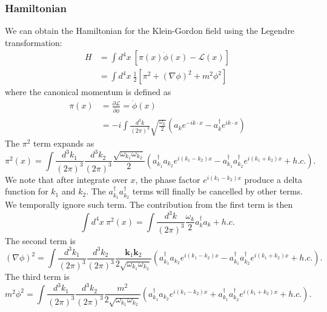 \subsubsection{Hamiltonian}

We can obtain the Hamiltonian for the Klein-Gordon field using the Legendre transformation:
\begin{equation}
\begin{aligned}
	H &= \int d^4 x\ \left[\pi(x) \dot{\phi}(x) - \mathcal L(x) \right] \\
	&= \int d^4 x\ \frac{1}{2} \left[\pi^2 + (\nabla \phi)^2 + m^2 \phi^2 \right]
\end{aligned}
\end{equation}
where the canonical momentum is defined as
\begin{equation}
\begin{aligned}
	\pi(x) &= \frac{\partial \mathcal L}{\partial \dot{\phi}} = \dot{\phi}(x) \\
	&= -i\int \frac{d^{3} k}{(2\pi)^{3}} \sqrt{\frac{\omega_{k}}{2}}\left(a_k 
		e^{-i k \cdot x} - a_k^{\dagger} e^{i k \cdot x}\right)
\end{aligned}
\end{equation}
The $\pi^2$ term expands as
\begin{equation}
	\pi^2(x) = \int \frac{d^{3} k_1}{(2\pi)^{3}} \frac{d^{3} k_2}{(2\pi)^{3}}
		\frac{\sqrt{\omega_{k_1} \omega_{k_2}}}{2} \left(a^\dagger_{k_1}a_{k_2}e^{i(k_1-k_2)x} - a^\dagger_{k_1} a^\dagger_{k_2} e^{i(k_1+k_2)x} + h.c.\right).
\end{equation}
We note that after integrate over $x$, the phase factor $e^{i(k_1-k_2)x}$ produce a delta function for $k_1$ and $k_2$.
The $a^\dagger_{k_1} a^\dagger_{k_2}$ terms will finally be cancelled by other terms.
We temporally ignore such term.
The contribution from the first term is then
\begin{equation}
	\int d^4 x\ \pi^2(x) = \int \frac{d^3 k}{(2\pi)^3} \frac{\omega_k}{2} a_k^\dagger a_k + h.c.
\end{equation}
The second term is
\begin{equation}
	(\nabla \phi)^2 = \int \frac{d^{3} k_1}{(2\pi)^{3}} \frac{d^{3} k_2}{(2\pi)^{3}}
		\frac{\bm k_1 \bm k_2}{2\sqrt{\omega_{k_1}\omega_{k_2}}} \left(a^\dagger_{k_1}a_{k_2}e^{i(k_1-k_2)x} - a^\dagger_{k_1} a^\dagger_{k_2} e^{i(k_1+k_2)x} + h.c.\right).
\end{equation}
The third term is
\begin{equation}
	m^2 \phi^2 = \int \frac{d^{3} k_1}{(2\pi)^{3}} \frac{d^{3} k_2}{(2\pi)^{3}}
		\frac{m^2}{2\sqrt{\omega_{k_1}\omega_{k_2}}} \left(a^\dagger_{k_1}a_{k_2}e^{i(k_1-k_2)x} + a^\dagger_{k_1} a^\dagger_{k_2} e^{i(k_1+k_2)x} + h.c.\right).
\end{equation}
